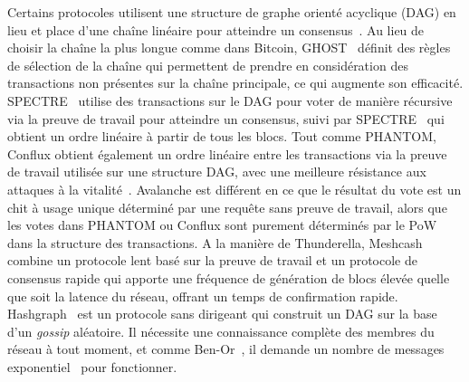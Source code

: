 {Certains protocoles utilisent une structure de graphe orienté acyclique (DAG) en lieu et place d'une chaîne linéaire
pour atteindre un consensus~\cite{SompolinskyZ15,SompolinskyLZ16,SompolinskyZ18,BentovHMN17,baird2016hashgraph}.
Au lieu de choisir la chaîne la plus longue comme dans Bitcoin, GHOST~\cite{SompolinskyZ15} définit des règles de
sélection de la chaîne qui permettent de prendre en considération des transactions non présentes sur la chaîne
principale, ce qui augmente son efficacité. SPECTRE~\cite{SompolinskyLZ16} utilise des transactions sur le DAG pour
voter de manière récursive via la preuve de travail pour atteindre un consensus, suivi par
SPECTRE~\cite{SompolinskyLZ16} qui obtient un ordre linéaire à partir de tous les blocs. Tout comme PHANTOM, Conflux
obtient également un ordre linéaire entre les transactions via la preuve de travail utilisée sur une structure DAG,
avec une meilleure résistance aux attaques à la vitalité~\cite{confluxLLXLC18}.
Avalanche est différent en ce que le résultat du vote est un chit à usage unique déterminé par une
requête sans preuve de travail, alors que les votes dans PHANTOM ou Conflux sont purement déterminés par le PoW
dans la structure des transactions. A la manière de Thunderella, Meshcash~\cite{BentovHMN17} combine un protocole
lent basé sur la preuve de travail et un protocole de consensus rapide qui apporte une fréquence de génération de blocs
élevée quelle que soit la latence du réseau, offrant un temps de confirmation rapide. Hashgraph~\cite{baird2016hashgraph}
est un protocole sans dirigeant qui construit un DAG sur la base d'un \emph{gossip} aléatoire. Il nécessite une
connaissance complète des membres du réseau à tout moment, et comme Ben-Or~\cite{ben1983another}, il demande un
nombre de messages exponentiel~\cite{aspnes2003randomized,CachinV17} pour fonctionner.

}
